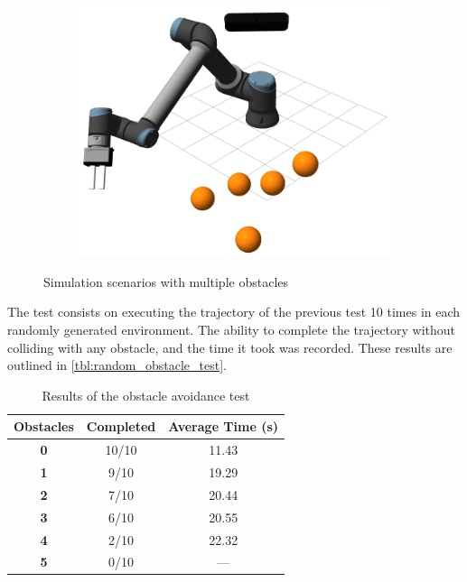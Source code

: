 \begin{figure}[h]
\begin{subfigure}{.2\linewidth}
        \includegraphics[width=.95\linewidth]{figs/chp6/obstacle_5.png}
    \end{subfigure}
    \caption{Simulation scenarios with multiple obstacles}
    \label{fig:mult_obstacle_test}
\end{figure}

\par The test consists on executing the trajectory of the previous test 10 times in each randomly generated environment. The ability to complete the trajectory without colliding with any obstacle, and the time it took was recorded. These results are outlined in \autoref{tbl:random_obstacle_test}.

\begin{table}[h]
    \centering
    \begin{tabular}{|c|c|c|}
    \hline
    \textbf{Obstacles} & \textbf{Completed} & \textbf{Average Time} (s) \\ \hline
    \textbf{0} & 10/10 & 11.43 \\ \hline
    \textbf{1} & 9/10 & 19.29 \\ \hline
    \textbf{2} & 7/10 & 20.44 \\ \hline
    \textbf{3} & 6/10 & 20.55 \\ \hline
    \textbf{4} & 2/10 & 22.32 \\ \hline
    \textbf{5} & 0/10 & --- \\ \hline
    \end{tabular}
    \caption{Results of the obstacle avoidance test}
    \label{tbl:random_obstacle_test}
\end{table}

